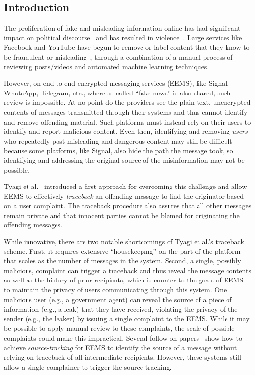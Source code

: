 \subsection{Introduction}
The proliferation of fake and misleading information online has had significant impact on political discourse~\cite{NYTimes:IsaRoo18} and has resulted in violence~\cite{WAPo:Samuels20}. Large services like Facebook and YouTube have begun to remove or label content that they know to be fraudulent or misleading~\cite{Facebook:fakeNews, Youtube:fakeNews}, through a combination of a manual process of reviewing posts/videos and automated machine learning techniques.

However, on end-to-end encrypted messaging services (EEMS), like Signal, WhatsApp, Telegram, etc., where so-called ``fake news'' is also shared, such review is impossible. At no point do the providers see the plain-text, unencrypted contents of messages transmitted through their systems and thus cannot identify and remove offending material.  Such platforms must instead rely on their users to identify and report malicious content.  Even then, identifying and removing \emph{users} who repeatedly post misleading and dangerous content may still be difficult because some platforms, like Signal, also hide the path the message took, so identifying and addressing the original source of the misinformation may not be possible.

Tyagi et al.~\cite{CCS:TyaMieRis19} introduced a first approach for overcoming this challenge and allow EEMS to effectively \emph{traceback} an offending  message to find the originator based on a user complaint.  The traceback procedure also assures that all other messages remain private and that innocent parties cannot be blamed for originating the offending messages.

While innovative, there are two notable shortcomings of Tyagi et al.'s traceback scheme. First, it requires extensive ``housekeeping'' on the part of the platform that scales as the number of messages in the system. Second, a single, possibly malicious, complaint can trigger a traceback and thus reveal the message contents as well as the history of prior recipients, which is counter to  the goals of EEMS to maintain the privacy of users communicating through this system. One malicious user (e.g., a government agent) can reveal the source of a piece of information (e.g., a leak) that they have received, violating the privacy of the sender (e.g., the leaker) by issuing a single complaint to the EEMS. While it may be possible to apply manual review to these complaints, the scale of possible complaints could make this impractical. Several follow-on papers~\cite{CCS:PeaEskBon21, eprint:IssAlhMay2021} show how to achieve \emph{source-tracking} for EEMS to identify the source of a message without relying on traceback of all intermediate recipients.  However, these systems still allow a single complainer to trigger the source-tracking. 


